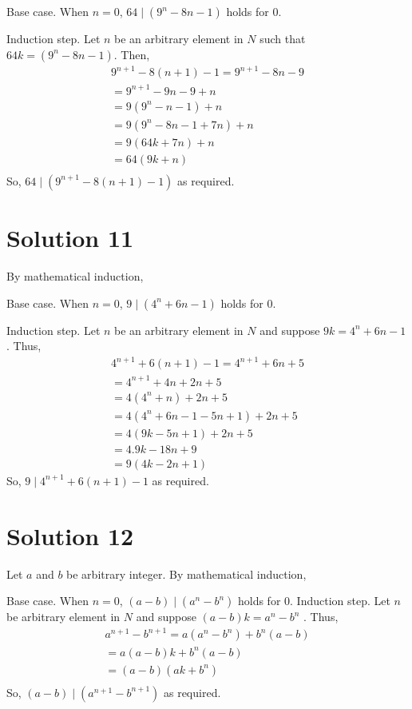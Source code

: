 \documentclass{article}
\begin{document}
Base case. When $n = 0$, $64 \mid (9^n - 8n - 1)$ holds for $0$.

Induction step. Let $n$ be an arbitrary element in $N$ such that $64k
= (9^n - 8n - 1)$. Then,
\begin{align*}
  9^{n+1} - 8(n+1) - 1 = 9^{n+1} - 8n - 9 \\
  = 9^{n+1} - 9n - 9 + n \\
  = 9(9^n - n - 1) + n \\
  = 9(9^n - 8n - 1 + 7n) + n \\
  = 9(64k + 7n) + n \\
  = 64(9k + n) \\
\end{align*}
So, $64 \mid (9^{n+1} - 8(n+1) - 1)$ as required.

\section{Solution 11}
By mathematical induction,

Base case. When $n = 0$, $9 \mid (4^n + 6n - 1)$ holds for $0$.

Induction step. Let $n$ be an arbitrary element in $N$ and suppose $9k
= 4^n + 6n - 1$. Thus,
\begin{align*}
  4^{n+1} + 6(n+1) - 1 = 4^{n+1} + 6n + 5 \\
  = 4^{n+1} + 4n + 2n + 5 \\
  = 4(4^{n} + n) + 2n + 5 \\
  = 4(4^{n} + 6n - 1 - 5n + 1) + 2n + 5 \\
  = 4(9k - 5n + 1) + 2n + 5 \\
  = 4.9k - 18n + 9 \\
  = 9(4k - 2n + 1)
\end{align*}
So, $9 \mid 4^{n+1} + 6(n+1) - 1$ as required.

\section{Solution 12}
Let $a$ and $b$ be arbitrary integer. By mathematical induction,

Base case. When $n = 0$, $(a-b) \mid (a^n - b^n)$ holds for $0$.
Induction step. Let $n$ be arbitrary element in $N$ and suppose
$(a-b)k = a^n - b^n$ . Thus,
\begin{align*}
  a^{n+1} - b^{n+1} = a(a^n - b^n) + b^n(a-b) \\
  = a(a-b)k + b^n(a-b) \\
  = (a-b)(ak + b^n) \\
\end{align*}
So, $(a-b) \mid (a^{n+1} - b^{n+1})$ as required.
\end{document}
